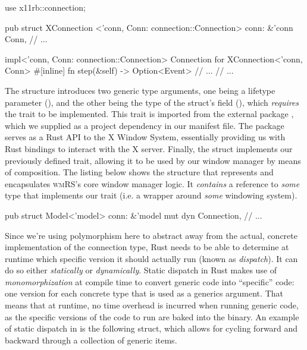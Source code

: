 \begin{rustblock}
  use x11rb::connection;
 
  pub struct XConnection
    <'conn, Conn: connection::Connection>
  {
    conn: &'conn Conn,
    // ...
  }
 
  impl<'conn, Conn: connection::Connection>
    Connection for XConnection<'conn, Conn>
  {
    #[inline]
    fn step(&self) -> Option<Event> {
      // ...
    }
    // ...
  }
\end{rustblock}

The  structure introduces two generic type arguments, one
being a lifetype parameter (), and the other being the type
of the struct's  field (), which \textit{requires}
the  trait to be implemented. This
 trait is imported from the external package
, which we supplied as a project dependency in our manifest file. The
 package serves as a Rust API to the X Window System, essentially
providing us with Rust bindings to interact with the X server. Finally, the
 struct implements our previously defined 
trait, allowing it to be used by our window manager by means of composition.
The listing below shows the structure that represents and encapsulates
\textsc{wmRS}'s core window manager logic. It \textit{contains} a reference to
\textit{some} type that implements our  trait (i.e. a wrapper
around \textit{some} windowing system).

\begin{rustblock}
  pub struct Model<'model> {
    conn: &'model mut dyn Connection,
    // ...
  }
\end{rustblock}


Since we're using polymorphism here to abstract away from the actual,
concrete implementation of the connection type, Rust needs to be able to
determine at runtime which specific version it should actually run (known as
\textit{dispatch})\cite{therustbook, rustblogtraits}. It can do so either
\textit{statically} or \textit{dynamically}. Static dispatch in Rust makes
use of \textit{monomorphization} at compile time to convert generic code into
``specific'' code: one version for each concrete type that is used as a generics
argument\cite{therustbook, rustblogtraits}. That means that at runtime, no time
overhead is incurred when running generic code, as the specific versions of the
code to run are baked into the binary\cite{therustbook, rustblogtraits}. An
example of static dispatch in \wmrs is the following  struct, which
allows for cycling forward and backward through a collection of generic items.

